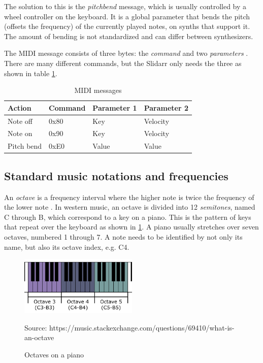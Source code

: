 \documentclass{article}
\newcommand{\source}[1]{\hfill \vspace{-15pt} \caption*{ \footnotesize Source: {#1}} }
\begin{document}
The solution to this is the \textit{pitchbend} message, which is usually controlled by a wheel controller on the keyboard. It is a global parameter that bends the pitch (offsets the frequency) of the currently played notes, on synths that support it. The amount of bending is not standardized and can differ between synthesizers.

The MIDI message consists of three bytes: the \textit{command} and two \textit{parameters} \cite{midistanford}. There are many different commands, but the Slidarr only needs the three as shown in table \ref{table:midi_msgs}.

\begin{table}[h]
  \centering
  \caption{MIDI messages}
  \label{table:midi_msgs}
  \begin{tabular}{llll}
    Action     & Command & Parameter 1 & Parameter 2 \\ \hline
    Note off   & 0x80    & Key         & Velocity    \\
    Note on    & 0x90    & Key         & Velocity    \\
    Pitch bend & 0xE0    & Value       & Value      
  \end{tabular}
\end{table}

\subsection{Standard music notations and frequencies}
An \textit{octave} is a frequency interval where the higher note is twice the frequency of the lower note \cite{octave}. In western music, an octave is divided into 12 \textit{semitones}, named C through B, which correspond to a key on a piano. This is the pattern of keys that repeat over the keyboard as shown in \ref{fig:octave}. A piano usually stretches over seven octaves, numbered 1 through 7. A note needs to be identified by not only its name, but also its octave index, e.g. C4.

\begin{figure}[h]
  \centering
  \includegraphics[width=0.5\textwidth]{octaves}
  \caption{Octaves on a piano}
  \source{https://music.stackexchange.com/questions/69410/what-is-an-octave}
  \label{fig:octave}
\end{figure}
\end{document}
